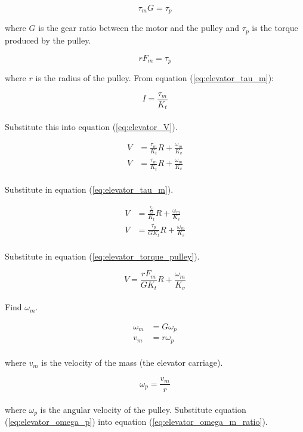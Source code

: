 \begin{equation}
  \tau_m G = \tau_p \label{eq:elevator_tau_m_ratio}
\end{equation}

where $G$ is the gear ratio between the motor and the pulley and $\tau_p$ is the
torque produced by the pulley.

\begin{equation}
  rF_m = \tau_p \label{eq:elevator_torque_pulley}
\end{equation}

where $r$ is the radius of the pulley. From equation (\ref{eq:elevator_tau_m}):

\begin{equation}
  I = \frac{\tau_m}{K_t}
\end{equation}
\\
Substitute this into equation (\ref{eq:elevator_V}).

\begin{align*}
  V &= \frac{\tau_m}{K_t} R + \frac{\omega_m}{K_v} \\
  V &= \frac{\tau_m}{K_t} R + \frac{\omega_m}{K_v}
\end{align*}
\\
Substitute in equation (\ref{eq:elevator_tau_m}).

\begin{align*}
  V &= \frac{\frac{\tau_p}{G}}{K_t} R + \frac{\omega_m}{K_v} \\
  V &= \frac{\tau_p}{GK_t} R + \frac{\omega_m}{K_v}
\end{align*}
\\
Substitute in equation (\ref{eq:elevator_torque_pulley}).

\begin{equation}
  V = \frac{rF_m}{GK_t} R + \frac{\omega_m}{K_v} \label{eq:elevator_Vinter1}
\end{equation}
\\
Find $\omega_m$.

\begin{align}
  \omega_m &= G \omega_p \label{eq:elevator_omega_m_ratio} \\
  v_m &= r \omega_p \nonumber
\end{align}
\\
where $v_m$ is the velocity of the mass (the elevator carriage).

\begin{equation}
  \omega_p = \frac{v_m}{r} \label{eq:elevator_omega_p}
\end{equation}
\\
where $\omega_p$ is the angular velocity of the pulley. Substitute equation
(\ref{eq:elevator_omega_p}) into equation (\ref{eq:elevator_omega_m_ratio}).

